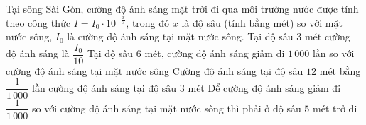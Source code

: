 \begin{ex}%
	Tại sông Sài Gòn, cường  độ ánh sáng mặt trời đi qua môi trường nước được tính theo công thức
	$I = I_0 \cdot 10^{-\tfrac{x}{3}}$, trong đó $x$ là độ sâu (tính bằng mét) so với mặt nước sông, $I_0$  là cường độ ánh sáng tại mặt nước sông.
	\choiceTF 
		{\True Tại độ sâu $3$ mét cường độ ánh sáng  là $\dfrac{I_0}{10}$}
		{Tại độ sâu $6$ mét, cường độ ánh sáng  giảm đi $1\,000$ lần so với cường độ ánh sáng tại mặt nước sông}
		{\True Cường độ ánh sáng tại độ sâu $12$ mét bằng $\dfrac{1}{1\,000}$ lần cường  độ ánh sáng tại độ sâu $3$ mét}
		{Để cường độ ánh sáng giảm đi $\dfrac{1}{1\,000}$ so với cường độ ánh sáng tại mặt nước sông thì phải  ở độ sâu $5$ mét trở đi}
\end{ex}


